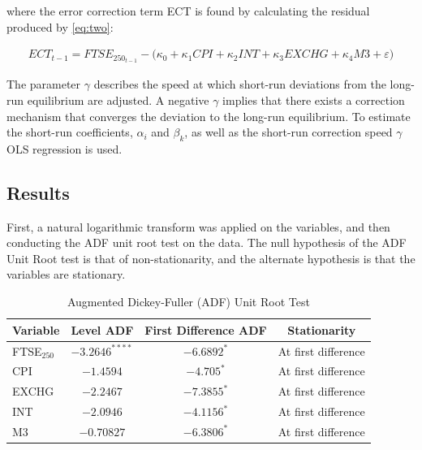 \documentclass[11pt,a4paper]{article}
\begin{document}
where the error correction term ECT is found by calculating the residual 
produced by \eqref{eq:two}:

\begin{align*}
    ECT_{t-1} = FTSE_{250_{t-1}} - \biggl(\kappa_0 + \kappa_1 CPI + \kappa_2 INT + \kappa_3 EXCHG + \kappa_4 M3 + \varepsilon \biggr)
\end{align*}

The parameter $\gamma$ describes the speed at which short-run deviations from the long-run equilibrium
are adjusted. A negative $\gamma$ implies that there exists a correction mechanism that converges the deviation 
to the long-run equilibrium. To estimate the short-run coefficients, $\alpha_i$ and $\beta_k$, as 
well as the short-run correction speed $\gamma$ OLS regression is used.

\subsection{Results}

First, a natural logarithmic transform was applied on the variables, and 
then conducting the ADF unit root test on the data. The null hypothesis of the 
ADF Unit Root test is that of non-stationarity, and the alternate hypothesis 
is that the variables are stationary.


\begin{table}[h!]
    \centering
    \caption{Augmented Dickey-Fuller (ADF) Unit Root Test}
    \begin{tabular}{lccc}
        \toprule
        \textbf{Variable} & \textbf{Level ADF} & \textbf{First Difference ADF} & \textbf{Stationarity} \\
        \midrule
        FTSE$_{250}$ & $-3.2646^{****}$ & $-6.6892^{*}$ & At first difference \\
        CPI          & $-1.4594$ & $-4.705^{*}$ & At first difference \\
        EXCHG        & $-2.2467$ & $-7.3855^{*}$ & At first difference \\
        INT          & $-2.0946$ & $-4.1156^{*}$ & At first difference \\
        M3           & $-0.70827$ & $-6.3806^{*}$ & At first difference \\
        \bottomrule
    \end{tabular}
\end{table}
\end{document}
